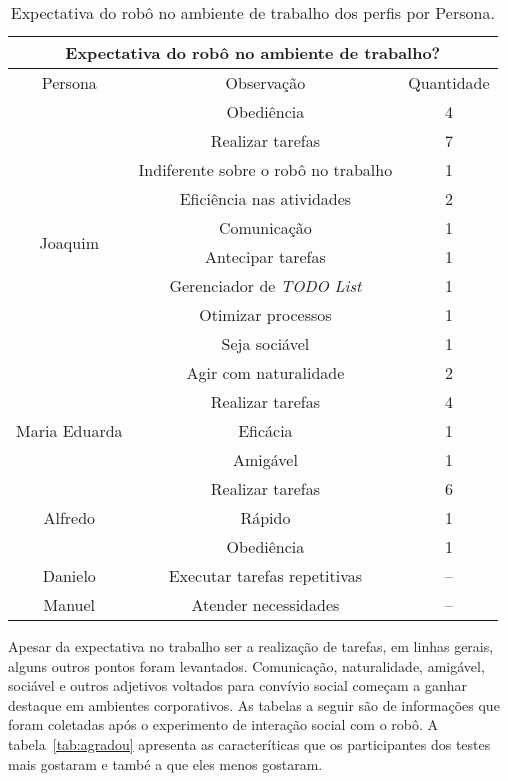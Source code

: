 \begin{table}[!ht]
	\caption{Expectativa do robô no ambiente de trabalho dos perfis por Persona.}
	\label{tab:expectativatrabalho}
	\centering
	\begin{tabular}{c | c | c }
        \hline
        \multicolumn{3}{c}{Expectativa do robô no ambiente de trabalho?} \\
        \hline
        Persona & Observação & Quantidade \\
        \hline
        \multirow{10}{*}{Joaquim} & Obediência & 4 \\
        \hhline{~--}
        & Realizar tarefas & 7 \\
        \hhline{~--}
        & Indiferente sobre o robô no trabalho & 1 \\
        \hhline{~--}
        & Eficiência nas atividades & 2 \\
        \hhline{~--}
        & Comunicação & 1 \\
        \hhline{~--}
        & Antecipar tarefas & 1 \\
        \hhline{~--}
        & Gerenciador de \emph{TODO List} & 1 \\
        \hhline{~--}
        & Otimizar processos & 1 \\
        \hhline{~--}
        & Seja sociável & 1 \\
        \hhline{~--}
        & Agir com naturalidade & 2 \\
        \hline
        \multirow{3}{*}{Maria Eduarda} & Realizar tarefas & 4 \\
        \hhline{~--}
        & Eficácia & 1 \\
        \hhline{~--}
        & Amigável & 1 \\
        \hline
        \multirow{3}{*}{Alfredo} & Realizar tarefas & 6 \\
        \hhline{~--}
        & Rápido & 1 \\
        \hhline{~--}
        & Obediência & 1 \\
        \hline
        Danielo & Executar tarefas repetitivas & -- \\
        \hline
        Manuel & Atender necessidades & -- \\
        \hline
    \end{tabular}
\end{table}

Apesar da expectativa no trabalho ser a realização de tarefas, em linhas gerais, alguns outros pontos foram levantados. Comunicação, naturalidade, amigável, sociável e outros adjetivos voltados para convívio social começam a ganhar destaque em ambientes corporativos. As tabelas a seguir são de informações que foram coletadas após o experimento de interação social com o robô. A tabela~\ref{tab:agradou} apresenta as caracteríticas que os participantes dos testes mais gostaram e també a que eles menos gostaram.

